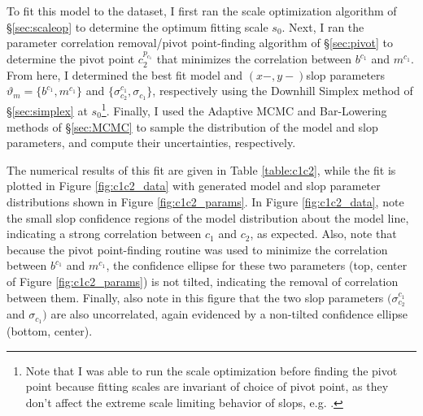 To fit this model to the dataset, I first ran the scale optimization algorithm of \S\ref{sec:scaleop} to determine the optimum fitting scale $s_0$. Next, I ran the parameter correlation removal/pivot point-finding algorithm of \S\ref{sec:pivot} to determine the pivot point $c_2^{p_{c_1}}$ that minimizes the correlation between $b^{c_1}$ and $m^{c_1}$. From here, I determined the best fit model and $(x-,y-)$slop parameters $\vartheta_m=\{b^{c_1}, m^{c_1}\}$ and $\{\sigma_{c_2}^{c_1}, \sigma_{c_1}\}$, respectively using the Downhill Simplex method of \S\ref{sec:simplex} at $s_0$\footnote{Note that I was able to run the scale optimization before finding the pivot point because fitting scales are invariant of choice of pivot point, as they don't affect the extreme scale limiting behavior of slops, e.g. \textcite{trotter}.}. Finally, I used the Adaptive MCMC and Bar-Lowering methods of \S\ref{sec:MCMC} to sample the distribution of the model and slop parameters, and compute their uncertainties, respectively. 

The numerical results of this fit are given in Table \ref{table:c1c2}, while the fit is plotted in Figure \ref{fig:c1c2_data} with generated model and slop parameter distributions shown in Figure \ref{fig:c1c2_params}. In Figure \ref{fig:c1c2_data}, note the small slop confidence regions of the model distribution about the model line, indicating a strong correlation between $c_1$ and $c_2$, as expected. Also, note that because the pivot point-finding routine was used to minimize the correlation between $b^{c_1}$ and $m^{c_1}$, the confidence ellipse for these two parameters (top, center of Figure \ref{fig:c1c2_params}) is not tilted, indicating the removal of correlation between them. Finally, also note in this figure that the two slop parameters $(\sigma_{c_2}^{c_1}$ and $\sigma_{c_1})$ are also uncorrelated, again evidenced by a non-tilted confidence ellipse (bottom, center).

